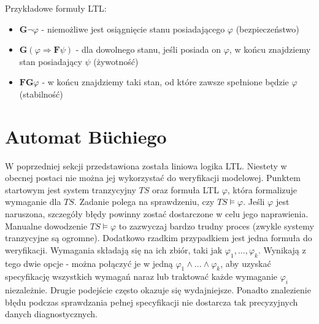 Przykładowe formuły LTL:
\begin{itemize}
\item $\mathbf{G}\neg\varphi$ - niemożliwe jest osiągnięcie stanu posiadającego $\varphi$ (bezpieczeństwo)
\item $\mathbf{G}(\varphi\Rightarrow\mathbf{F}\psi)$ - dla dowolnego stanu, jeśli posiada on $\varphi$, w końcu znajdziemy stan posiadający $\psi$ (żywotność)
\item $\mathbf{FG}\varphi$ - w końcu znajdziemy taki stan, od które zawsze spełnione będzie $\varphi$ (stabilność)
\end{itemize}


\section{Automat Büchiego}

W poprzedniej sekcji przedstawiona została liniowa logika LTL.
Niestety w obecnej postaci nie można jej wykorzystać do weryfikacji modelowej.
Punktem startowym jest system tranzycyjny $TS$ oraz formuła LTL $\varphi$, która formalizuje wymaganie dla $TS$.
Zadanie polega na sprawdzeniu, czy $TS \models \varphi$.
Jeśli $\varphi$ jest naruszona, szczegóły błędy powinny zostać dostarczone w celu jego naprawienia.
Manualne dowodzenie $TS \models \varphi$ to zazwyczaj bardzo trudny proces (zwykle systemy tranzycyjne są ogromne).
Dodatkowo rzadkim przypadkiem jest jedna formuła do weryfikacji.
Wymagania składają się na ich zbiór, taki jak $\varphi_1,...,\varphi_k$.
Wynikają z tego dwie opcje - można połączyć je w jedną $\varphi_1 \land ... \land \varphi_k$, aby uzyskać specyfikację wszystkich wymagań naraz lub traktować każde wymaganie $\varphi_i$ niezależnie.
Drugie podejście często okazuje się wydajniejsze.
Ponadto znalezienie błędu podczas sprawdzania pełnej specyfikacji nie dostarcza tak precyzyjnych danych diagnostycznych.

